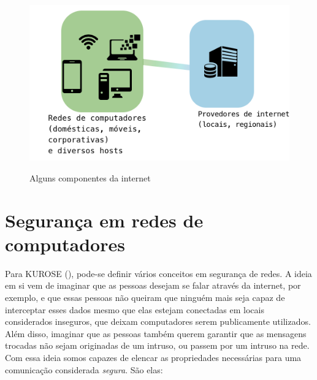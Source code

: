 \begin{figure}[H]
\caption{\small Alguns componentes da internet}
\centering
\includegraphics[scale=0.5]{figs/fig3_teste.png}
\label{f.internet_01}
\end{figure}

\section{Segurança em redes de computadores}
\label{s.seguranca}

Para KUROSE (\citeyear{kurose09}), pode-se definir vários conceitos em segurança de
redes. A ideia em si vem de imaginar que as pessoas desejam se falar através da
internet, por exemplo, e que essas pessoas não queiram que ninguém mais seja
capaz de interceptar esses dados mesmo que elas estejam conectadas em locais
considerados inseguros, que deixam computadores serem publicamente utilizados.
Além disso, imaginar que as pessoas também querem garantir que as mensagens
trocadas não sejam originadas de um intruso, ou passem por um intruso na rede.
Com essa ideia somos capazes de elencar as propriedades necessárias para uma
comunicação considerada \emph{segura}. São elas:

